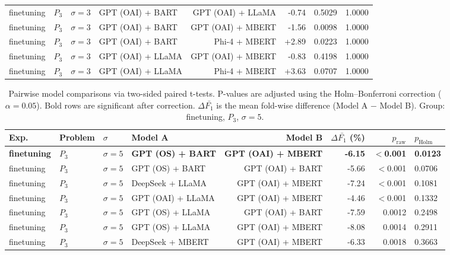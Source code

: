 \begin{table}[htbp]
\begin{tabular*}{\textwidth}{@{\extracolsep{\fill}}llllrrrl}
finetuning & $P_3$ & $\sigma{=}3$ & GPT (OAI) + BART & GPT (OAI) + LLaMA & -0.74 & 0.5029 & 1.0000 \\
finetuning & $P_3$ & $\sigma{=}3$ & GPT (OAI) + BART & GPT (OAI) + MBERT & -1.56 & 0.0098 & 1.0000 \\
finetuning & $P_3$ & $\sigma{=}3$ & GPT (OAI) + BART & Phi-4 + MBERT & +2.89 & 0.0223 & 1.0000 \\
finetuning & $P_3$ & $\sigma{=}3$ & GPT (OAI) + LLaMA & GPT (OAI) + MBERT & -0.83 & 0.4198 & 1.0000 \\
finetuning & $P_3$ & $\sigma{=}3$ & GPT (OAI) + LLaMA & Phi-4 + MBERT & +3.63 & 0.0707 & 1.0000 \\
\hline
\end{tabular*}
\end{table}
\newpage
\begin{table}[htbp]
\centering
\caption{Pairwise model comparisons via two-sided paired t-tests. P-values are adjusted using the Holm--Bonferroni correction ($\alpha = 0.05$). Bold rows are significant after correction. $\Delta\bar{F_1}$ is the mean fold-wise difference (Model A $-$ Model B). Group: finetuning, $P_3$, $\sigma{=}5$.}
\label{tab:holm_ttests_finetuning_p3_alpha5}
\begin{tabular*}{\textwidth}{@{\extracolsep{\fill}}llllrrrl}
\hline
\textbf{Exp.} & \textbf{Problem} & \textbf{$\sigma$} & \textbf{Model A} & \textbf{Model B} & \textbf{$\Delta \bar{F_1}$ (\%)} & \textbf{$p_\text{raw}$} & \textbf{$p_\text{Holm}$} \\
\hline
\textbf{finetuning} & \textbf{$P_3$} & \textbf{$\sigma{=}5$} & \textbf{GPT (OS) + BART} & \textbf{GPT (OAI) + MBERT} & \textbf{-6.15} & \textbf{$<$0.001} & \textbf{0.0123} \\
finetuning & $P_3$ & $\sigma{=}5$ & GPT (OS) + BART & GPT (OAI) + BART & -5.66 & $<$0.001 & 0.0706 \\
finetuning & $P_3$ & $\sigma{=}5$ & DeepSeek + LLaMA & GPT (OAI) + MBERT & -7.24 & $<$0.001 & 0.1081 \\
finetuning & $P_3$ & $\sigma{=}5$ & GPT (OAI) + LLaMA & GPT (OAI) + MBERT & -4.46 & $<$0.001 & 0.1332 \\
finetuning & $P_3$ & $\sigma{=}5$ & GPT (OS) + LLaMA & GPT (OAI) + BART & -7.59 & 0.0012 & 0.2498 \\
finetuning & $P_3$ & $\sigma{=}5$ & GPT (OS) + LLaMA & GPT (OAI) + MBERT & -8.08 & 0.0014 & 0.2911 \\
finetuning & $P_3$ & $\sigma{=}5$ & DeepSeek + MBERT & GPT (OAI) + MBERT & -6.33 & 0.0018 & 0.3663 \\

\end{tabular*}
\end{table}
